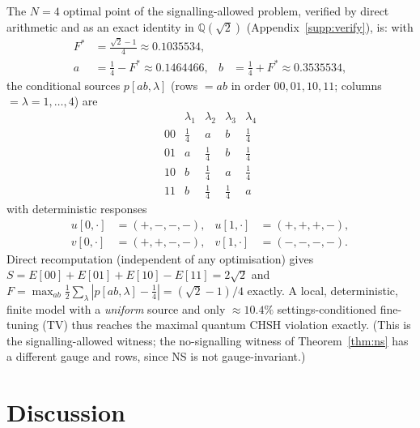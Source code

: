 \documentclass[aps,pra,reprint,superscriptaddress,floatfix]{revtex4-2}
\begin{document}
The $N=4$ optimal point of the signalling-allowed problem, verified by direct
arithmetic and as an exact identity in $\mathbb{Q}(\sqrt2)$ (Appendix~\ref{supp:verify}), is: with
\begin{equation}
\begin{aligned}
F^*&=\frac{\sqrt2-1}{4}\approx0.1035534,\\
a&=\tfrac14-F^*\approx0.1464466, & b&=\tfrac14+F^*\approx0.3535534,
\end{aligned}
\label{eq:witconst}
\end{equation}
the conditional sources $p[ab,\lambda]$ (rows $=ab$ in order $00,01,10,11$;
columns $=\lambda=1,\dots,4$) are
\begin{equation}
\begin{array}{c|cccc}
 & \lambda_1 & \lambda_2 & \lambda_3 & \lambda_4\\ \hline
00 & \tfrac14 & a & b & \tfrac14\\
01 & a & \tfrac14 & b & \tfrac14\\
10 & b & \tfrac14 & a & \tfrac14\\
11 & b & \tfrac14 & \tfrac14 & a
\end{array}
\label{eq:witp}
\end{equation}
with deterministic responses
\begin{equation}
\begin{aligned}
u[0,\cdot]&=(+,-,-,-), & u[1,\cdot]&=(+,+,+,-),\\
v[0,\cdot]&=(+,+,-,-), & v[1,\cdot]&=(-,-,-,-).
\end{aligned}
\label{eq:wituv}
\end{equation}
Direct recomputation (independent of any optimisation) gives
$S=E[00]+E[01]+E[10]-E[11]=2\sqrt2$ and
$F=\max_{ab}\tfrac12\sum_\lambda|p[ab,\lambda]-\tfrac14|=(\sqrt2-1)/4$
exactly. A local, deterministic, finite model with a \emph{uniform} source
and only $\approx10.4\%$ settings-conditioned fine-tuning (TV) thus reaches
the maximal quantum CHSH violation exactly. (This is the signalling-allowed
witness; the no-signalling witness of Theorem~\ref{thm:ns} has a different
gauge and rows, since NS is not gauge-invariant.)

\section{Discussion}
\label{sec:discussion}
\end{document}
